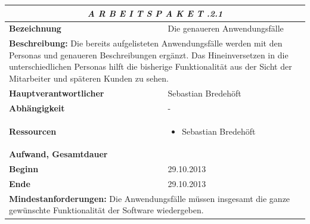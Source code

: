 \documentclass[fontsize=12pt,paper=a4,twoside]{scrartcl}
\begin{document}
\begin{tabular}{p{7.5cm}|p{7.5cm}}\toprule
\multicolumn{2}{c}{\textbf{\textit{A R B E I T S P A K E T \quad 2.3.2.1}}} \\ \toprule \hline
\textbf{Bezeichnung} & Die genaueren Anwendungsfälle \\\hline
\multicolumn{2}{p{15cm}}{\textbf{Beschreibung:} \newline 
Die bereits aufgelisteten Anwendungsfälle werden mit den Personas und genaueren Beschreibungen ergänzt. Das Hineinversetzen in die unterschiedlichen Personas hilft die bisherige Funktionalität aus der Sicht der Mitarbeiter und späteren Kunden zu sehen. }  \\\hline
\textbf{Hauptverantwortlicher} & Sebastian Bredehöft \\\hline
\textbf{Abhängigkeit} & -\\\hline
\textbf{Ressourcen} & \begin{itemize} 
\itemsep0pt
\item Sebastian Bredehöft
\end{itemize} \\\hline
\textbf{Aufwand, Gesamtdauer} & \\\hline
\textbf{Beginn} & 29.10.2013 \\\hline
\textbf{Ende} & 29.10.2013\\\hline
\multicolumn{2}{p{15cm}}{\textbf{Mindestanforderungen: } \newline
Die Anwendungsfälle müssen insgesamt die ganze gewünschte Funktionalität der Software wiedergeben.  }  \\ \toprule
\end{tabular} \\\\
\end{document}
